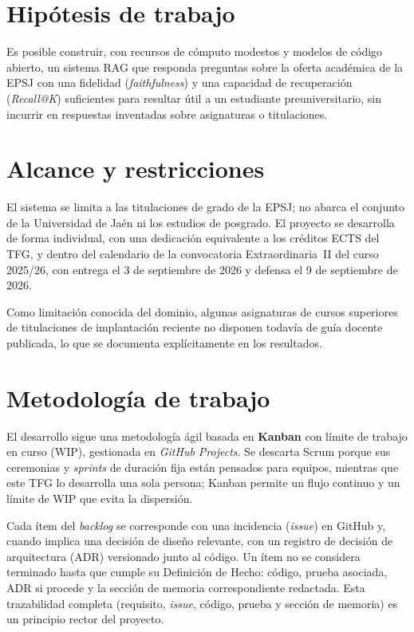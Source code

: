 \section{Hipótesis de trabajo}

Es posible construir, con recursos de cómputo modestos y modelos de código
abierto, un sistema RAG que responda preguntas sobre la oferta académica de la
EPSJ con una fidelidad (\textit{faithfulness}) y una capacidad de recuperación
(\textit{Recall@K}) suficientes para resultar útil a un estudiante
preuniversitario, sin incurrir en respuestas inventadas sobre asignaturas o
titulaciones.

\section{Alcance y restricciones}

El sistema se limita a las titulaciones de grado de la EPSJ; no abarca el
conjunto de la Universidad de Jaén ni los estudios de posgrado. El proyecto se
desarrolla de forma individual, con una dedicación equivalente a los créditos
ECTS del TFG, y dentro del calendario de la convocatoria Extraordinaria~II del
curso 2025/26, con entrega el 3 de septiembre de 2026 y defensa el 9 de
septiembre de 2026.

Como limitación conocida del dominio, algunas asignaturas de cursos superiores
de titulaciones de implantación reciente no disponen todavía de guía docente
publicada, lo que se documenta explícitamente en los resultados.

\section{Metodología de trabajo}

El desarrollo sigue una metodología ágil basada en \textbf{Kanban} con límite de
trabajo en curso (WIP), gestionada en \textit{GitHub Projects}. Se descarta
Scrum porque sus ceremonias y \textit{sprints} de duración fija están pensados
para equipos, mientras que este TFG lo desarrolla una sola persona; Kanban
permite un flujo continuo y un límite de WIP que evita la dispersión.

Cada ítem del \textit{backlog} se corresponde con una incidencia (\textit{issue})
en GitHub y, cuando implica una decisión de diseño relevante, con un registro de
decisión de arquitectura (ADR) versionado junto al código. Un ítem no se
considera terminado hasta que cumple su Definición de Hecho: código, prueba
asociada, ADR si procede y la sección de memoria correspondiente redactada. Esta
trazabilidad completa (requisito, \textit{issue}, código, prueba y sección de
memoria) es un principio rector del proyecto.

